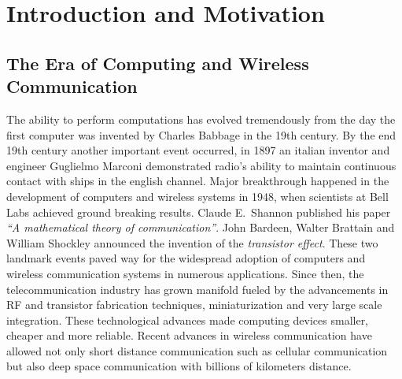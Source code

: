 \chapter{Introduction and Motivation} \label{chap:introduction}

\section{The Era of Computing and Wireless Communication}
The ability to perform computations has evolved tremendously from the day the first computer was invented by Charles Babbage in the 19th century. By the end 19th century another important event occurred, in 1897 an italian inventor and engineer Guglielmo Marconi demonstrated radio's ability to maintain continuous contact with ships in the english channel. Major breakthrough happened in the development of computers and wireless systems in 1948, when scientists at Bell Labs achieved ground breaking results. Claude E.~Shannon published his paper \emph{``A mathematical theory of communication''}. John Bardeen, Walter Brattain and William Shockley announced the invention of the \emph{transistor effect}. These two landmark events paved way for the widespread adoption of computers and wireless communication systems in numerous applications. Since then, the telecommunication industry has grown manifold fueled by the advancements in RF and transistor fabrication techniques, miniaturization and very large scale integration. These technological advances made computing devices smaller, cheaper and more reliable. Recent advances in wireless communication have allowed not only short distance communication such as cellular communication but also deep space communication with billions of kilometers distance.  \newline

